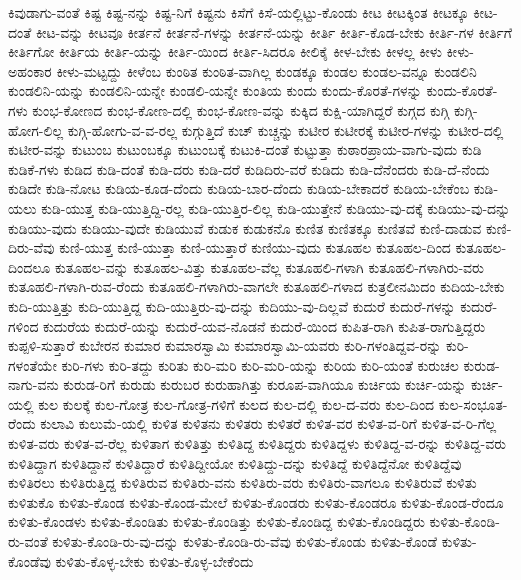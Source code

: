 {ಕಿವುಡಾಗು-ವಂತೆ
ಕಿಷ್ಟ
ಕಿಷ್ಟ-ನನ್ನು
ಕಿಷ್ಟ-ನಿಗೆ
ಕಿಷ್ಟನು
ಕಿಸೆಗೆ
ಕಿಸೆ-ಯಲ್ಲಿಟ್ಟು-ಕೊಂಡು
ಕೀಟ
ಕೀಟಕ್ಕಿಂತ
ಕೀಟಕ್ಕೂ
ಕೀಟ-ದಂತೆ
ಕೀಟ-ವನ್ನು
ಕೀಟವೂ
ಕೀರ್ತನೆ
ಕೀರ್ತನೆ-ಗಳನ್ನು
ಕೀರ್ತನೆ-ಯನ್ನು
ಕೀರ್ತಿ
ಕೀರ್ತಿ-ಕೊಡ-ಬೇಕು
ಕೀರ್ತಿ-ಗಳ
ಕೀರ್ತಿಗೆ
ಕೀರ್ತಿಗೋ
ಕೀರ್ತಿಯ
ಕೀರ್ತಿ-ಯನ್ನು
ಕೀರ್ತಿ-ಯಿಂದ
ಕೀರ್ತಿ-ಸಿದರೂ
ಕೀಲಿಕೈ
ಕೀಳ-ಬೇಕು
ಕೀಳಲ್ಲ
ಕೀಳು
ಕೀಳು-ಅಹಂಕಾರ
ಕೀಳು-ಮಟ್ಟದ್ದು
ಕೀಳೆಂಬ
ಕುಂಠಿತ
ಕುಂಠಿತ-ವಾಗಿಲ್ಲ
ಕುಂಡಕ್ಕೂ
ಕುಂಡಲ
ಕುಂಡಲ-ವನ್ನೂ
ಕುಂಡಲಿನಿ
ಕುಂಡಲಿನಿ-ಯನ್ನು
ಕುಂಡಲಿನಿ-ಯನ್ನೇ
ಕುಂಡಲಿ-ಯನ್ನೇ
ಕುಂತಿಯ
ಕುಂದು
ಕುಂದು-ಕೊರತೆ-ಗಳನ್ನು
ಕುಂದು-ಕೊರತೆ-ಗಳು
ಕುಂಭ-ಕೋಣದ
ಕುಂಭ-ಕೋಣ-ದಲ್ಲಿ
ಕುಂಭ-ಕೋಣ-ವನ್ನು
ಕುಕ್ಕಿದ
ಕುಕ್ಷಿ-ಯಾಗಿದ್ದರೆ
ಕುಗ್ಗದ
ಕುಗ್ಗಿ
ಕುಗ್ಗಿ-ಹೋಗ-ಲಿಲ್ಲ
ಕುಗ್ಗಿ-ಹೋಗು-ವ-ವ-ರಲ್ಲ
ಕುಗ್ಗುತ್ತಿದೆ
ಕುಚ್
ಕುಚ್ಚನ್ನು
ಕುಟೀರ
ಕುಟೀರಕ್ಕೆ
ಕುಟೀರ-ಗಳನ್ನು
ಕುಟೀರ-ದಲ್ಲಿ
ಕುಟೀರ-ವನ್ನು
ಕುಟುಂಬ
ಕುಟುಂಬಕ್ಕೂ
ಕುಟುಂಬಕ್ಕೆ
ಕುಟುಕಿ-ದಂತೆ
ಕುಟ್ಟುತ್ತಾ
ಕುಠಾರಪ್ರಾಯ-ವಾಗು-ವುದು
ಕುಡಿ
ಕುಡಿಕೆ-ಗಳು
ಕುಡಿದ
ಕುಡಿ-ದಂತೆ
ಕುಡಿ-ದರು
ಕುಡಿ-ದರೆ
ಕುಡಿದಿರು-ವರೆ
ಕುಡಿದು
ಕುಡಿ-ದೆನೆಂದರು
ಕುಡಿ-ದೆ-ನೆಂದು
ಕುಡಿದೇ
ಕುಡಿ-ನೋಟ
ಕುಡಿಯ-ಕೂಡ-ದೆಂದು
ಕುಡಿಯ-ಬಾರ-ದೆಂದು
ಕುಡಿಯ-ಬೇಕಾದರೆ
ಕುಡಿಯ-ಬೇಕೆಂಬ
ಕುಡಿ-ಯಲು
ಕುಡಿ-ಯುತ್ತ
ಕುಡಿ-ಯುತ್ತಿದ್ದಿ-ರಲ್ಲ
ಕುಡಿ-ಯುತ್ತಿರ-ಲಿಲ್ಲ
ಕುಡಿ-ಯುತ್ತೇನೆ
ಕುಡಿಯು-ವು-ದಕ್ಕೆ
ಕುಡಿಯು-ವು-ದನ್ನು
ಕುಡಿಯು-ವುದು
ಕುಡಿಯು-ವುದೇ
ಕುಡಿಯುವೆ
ಕುಡುಕ
ಕುಡುಕನೊ
ಕುಣಿತ
ಕುಣಿತಕ್ಕೂ
ಕುಣಿತವೆ
ಕುಣಿ-ದಾಡುವ
ಕುಣಿ-ದಿರು-ವೆವು
ಕುಣಿ-ಯುತ್ತ
ಕುಣಿ-ಯುತ್ತಾ
ಕುಣಿ-ಯುತ್ತಾರೆ
ಕುಣಿಯು-ವುದು
ಕುತೂಹಲ
ಕುತೂಹಲ-ದಿಂದ
ಕುತೂಹಲ-ದಿಂದಲೂ
ಕುತೂಹಲ-ವನ್ನು
ಕುತೂಹಲ-ವಿತ್ತು
ಕುತೂಹಲ-ವೆಲ್ಲ
ಕುತೂಹಲಿ-ಗಳಾಗಿ
ಕುತೂಹಲಿ-ಗಳಾಗಿರು-ವರು
ಕುತೂಹಲಿ-ಗಳಾಗಿ-ರುವ-ರೆಂದು
ಕುತೂಹಲಿ-ಗಳಾಗಿರು-ವಾಗಲೇ
ಕುತೂಹಲಿ-ಗಳಾದ
ಕುತ್ರಲೀನಮಿದಂ
ಕುದಿಯ-ಬೇಕು
ಕುದಿ-ಯುತ್ತಿತ್ತು
ಕುದಿ-ಯುತ್ತಿದ್ದ
ಕುದಿ-ಯುತ್ತಿರು-ವು-ದನ್ನು
ಕುದಿಯು-ವು-ದಿಲ್ಲವೆ
ಕುದುರೆ
ಕುದುರೆ-ಗಳನ್ನು
ಕುದುರೆ-ಗಳಿಂದ
ಕುದುರೆಯ
ಕುದುರೆ-ಯನ್ನು
ಕುದುರೆ-ಯವ-ನೊಡನೆ
ಕುದುರೆ-ಯಿಂದ
ಕುಪಿತ-ರಾಗಿ
ಕುಪಿತ-ರಾಗುತ್ತಿದ್ದರು
ಕುಪ್ಪಳಿ-ಸುತ್ತಾರೆ
ಕುಬೇರನ
ಕುಮಾರ
ಕುಮಾರಸ್ವಾಮಿ
ಕುಮಾರಸ್ವಾಮಿ-ಯವರು
ಕುರಿ-ಗಳಂತಿದ್ದವ-ರನ್ನು
ಕುರಿ-ಗಳಂತೆಯೇ
ಕುರಿ-ಗಳು
ಕುರಿ-ತದ್ದು
ಕುರಿತು
ಕುರಿ-ಮರಿ
ಕುರಿ-ಮರಿ-ಯನ್ನು
ಕುರಿಯ
ಕುರಿ-ಯಂತೆ
ಕುರುಚಲ
ಕುರುಡ-ನಾಗು-ವನು
ಕುರುಡ-ರಿಗೆ
ಕುರುಡು
ಕುರುಬರ
ಕುರುಹಾಗಿತ್ತು
ಕುರೂಪ-ವಾಗಿಯೂ
ಕುರ್ಚಿಯ
ಕುರ್ಚಿ-ಯನ್ನು
ಕುರ್ಚಿ-ಯಲ್ಲಿ
ಕುಲ
ಕುಲಕ್ಕೆ
ಕುಲ-ಗೋತ್ರ
ಕುಲ-ಗೋತ್ರ-ಗಳಿಗೆ
ಕುಲದ
ಕುಲ-ದಲ್ಲಿ
ಕುಲ-ದ-ವರು
ಕುಲ-ದಿಂದ
ಕುಲ-ಸಂಭೂತ-ರೆಂದು
ಕುಲಾವಿ
ಕುಲುಮೆ-ಯಲ್ಲಿ
ಕುಳಿತ
ಕುಳಿತನು
ಕುಳಿತರು
ಕುಳಿತರೆ
ಕುಳಿತ-ವರ
ಕುಳಿತ-ವ-ರಿಗೆ
ಕುಳಿತ-ವ-ರಿ-ಗೆಲ್ಲ
ಕುಳಿತ-ವರು
ಕುಳಿತ-ವ-ರೆಲ್ಲ
ಕುಳಿತಾಗ
ಕುಳಿತಿತ್ತು
ಕುಳಿತಿದ್ದ
ಕುಳಿತಿದ್ದರು
ಕುಳಿತಿದ್ದಳು
ಕುಳಿತಿದ್ದ-ವ-ರನ್ನು
ಕುಳಿತಿದ್ದ-ವರು
ಕುಳಿತಿದ್ದಾಗ
ಕುಳಿತಿದ್ದಾನೆ
ಕುಳಿತಿದ್ದಾರೆ
ಕುಳಿತಿದ್ದೀಯೋ
ಕುಳಿತಿದ್ದು-ದನ್ನು
ಕುಳಿತಿದ್ದೆ
ಕುಳಿತಿದ್ದೆನೋ
ಕುಳಿತಿದ್ದೆವು
ಕುಳಿತಿರಲು
ಕುಳಿತಿರುತ್ತಿದ್ದ
ಕುಳಿತಿರುವ
ಕುಳಿತಿರು-ವನು
ಕುಳಿತಿರು-ವರು
ಕುಳಿತಿರು-ವಾಗಲೂ
ಕುಳಿತಿರುವೆ
ಕುಳಿತು
ಕುಳಿತುಕೊ
ಕುಳಿತು-ಕೊಂಡ
ಕುಳಿತು-ಕೊಂಡ-ಮೇಲೆ
ಕುಳಿತು-ಕೊಂಡರು
ಕುಳಿತು-ಕೊಂಡರೂ
ಕುಳಿತು-ಕೊಂಡ-ರೆಂದೂ
ಕುಳಿತು-ಕೊಂಡಳು
ಕುಳಿತು-ಕೊಂಡಿತು
ಕುಳಿತು-ಕೊಂಡಿತ್ತು
ಕುಳಿತು-ಕೊಂಡಿದ್ದ
ಕುಳಿತು-ಕೊಂಡಿದ್ದರು
ಕುಳಿತು-ಕೊಂಡಿ-ರು-ವಂತೆ
ಕುಳಿತು-ಕೊಂಡಿ-ರು-ವು-ದನ್ನು
ಕುಳಿತು-ಕೊಂಡಿ-ರು-ವೆವು
ಕುಳಿತು-ಕೊಂಡು
ಕುಳಿತು-ಕೊಂಡೆ
ಕುಳಿತು-ಕೊಂಡೆವು
ಕುಳಿತು-ಕೊಳ್ಳ-ಬೇಕು
ಕುಳಿತು-ಕೊಳ್ಳ-ಬೇಕೆಂದು
}
